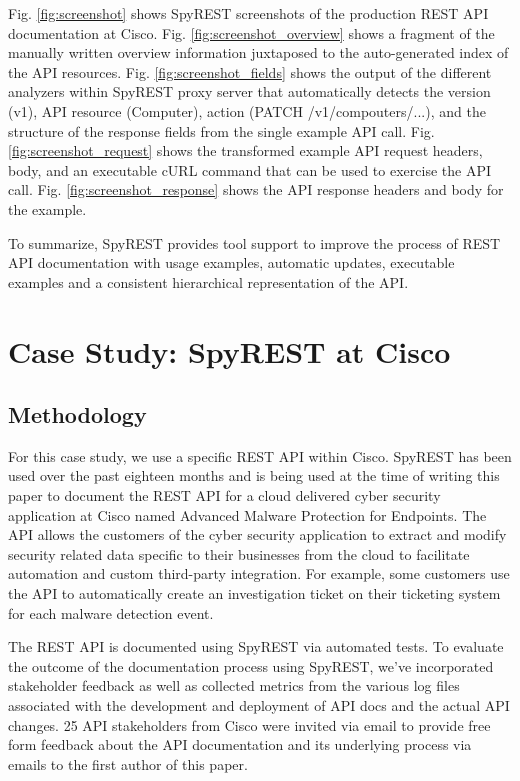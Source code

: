 Fig. \ref{fig:screenshot} shows SpyREST screenshots of the production REST API documentation at Cisco. Fig. \ref{fig:screenshot_overview} shows a fragment of the manually written overview information juxtaposed to the auto-generated index of the API resources. Fig. \ref{fig:screenshot_fields} shows the output of the different analyzers within SpyREST proxy server that automatically detects the version (v1), API resource (Computer), action (PATCH /v1/compouters/...), and the structure of the response fields from the single example API call. Fig. \ref{fig:screenshot_request} shows the transformed example API request headers, body, and an executable cURL command that can be used to exercise the API call. Fig. \ref{fig:screenshot_response} shows the API response headers and body for the example.

To summarize, SpyREST provides tool support to improve the process of REST API documentation with usage examples, automatic updates, executable examples and a consistent hierarchical representation of the API.

\section{Case Study: SpyREST at Cisco}

\subsection{Methodology}
For this case study, we use a specific REST API within Cisco. SpyREST has been used over the past eighteen months and is being used at the time of writing this paper to document the REST API for a cloud delivered cyber security application at Cisco named Advanced Malware Protection for Endpoints. The API allows the customers of the cyber security application to extract and modify security related data specific to their businesses from the cloud to facilitate automation and custom third-party integration. For example, some customers use the API to automatically create an investigation ticket on their ticketing system for each malware detection event.

The REST API is documented using SpyREST via automated tests. To evaluate the outcome of the documentation process using SpyREST, we've incorporated stakeholder feedback as well as collected metrics from the various log files associated with the development and deployment of API docs and the actual API changes. 25 API stakeholders from Cisco were invited via email to provide free form feedback about the API documentation and its underlying process via emails to the first author of this paper.

